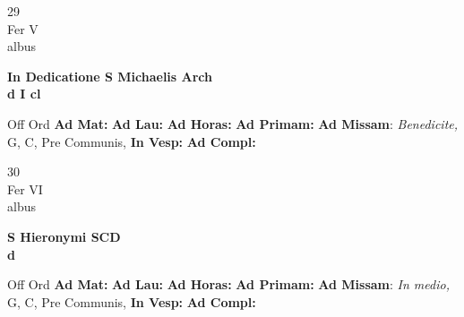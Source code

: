 \documentclass[10pt, openany]{book}
\begin{document}
    \begin{center}
        \begin{minipage}{3.5in}
            \vspace{2em}
            \begin{minipage}{0.5in}
                {\Huge 29} \\
                {\normalsize Fer V} \\
                {\normalsize albus}
            \end{minipage}
            \begin{minipage}{3.0in}
                \textbf{ \large In Dedicatione S Michaelis Arch \\
                \textnormal{\normalsize d I cl}} \\ 
            \end{minipage}
            \begin{justify}Off Ord
                \textbf{Ad Mat: }
                \textbf{Ad Lau: }
                \textbf{Ad Horas: }
                \textbf{Ad Primam: }\textbf{Ad Missam}: \textit{Benedicite,} G, C, Pre Communis,  
                \textbf{In Vesp: }
                \textbf{Ad Compl: }
            \end{justify}
        \end{minipage}
    \end{center}

    \begin{center}
        \begin{minipage}{3.5in}
            \vspace{2em}
            \begin{minipage}{0.5in}
                {\Huge 30} \\
                {\normalsize Fer VI} \\
                {\normalsize albus}
            \end{minipage}
            \begin{minipage}{3.0in}
                \textbf{ \large S Hieronymi SCD \\
                \textnormal{\normalsize d}} \\ 
            \end{minipage}
            \begin{justify}Off Ord
                \textbf{Ad Mat: }
                \textbf{Ad Lau: }
                \textbf{Ad Horas: }
                \textbf{Ad Primam: }\textbf{Ad Missam}: \textit{In medio,} G, C, Pre Communis,  
                \textbf{In Vesp: }
                \textbf{Ad Compl: }
            \end{justify}
        \end{minipage}
    \end{center}
\end{document}
